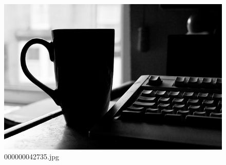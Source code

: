     \begin{figure}[h]
        \centering
        \includegraphics[width=0.8\linewidth]{../image set/easy/000000042735.jpg}
        \caption{000000042735.jpg}
    \end{figure}
